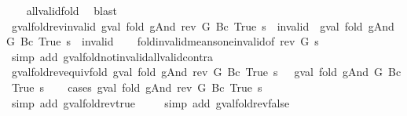 \begin{isabellebody}
%
\isadelimproof
\ \ %
\endisadelimproof
%
\isatagproof
{}\isamarkupfalse%
\ all{\isacharunderscore}valid{\isacharunderscore}fold\ \isamarkupfalse%
\ blast%
\endisatagproof
{\isafoldproof}%
%
\isadelimproof
\isanewline
%
\endisadelimproof
\isanewline
{}\isamarkupfalse%
\ gval{\isacharunderscore}fold{\isacharunderscore}rev{\isacharunderscore}invalid{\isacharcolon}\ {\isachardoublequoteopen}gval\ {\isacharparenleft}fold\ gAnd\ {\isacharparenleft}rev\ G{\isacharparenright}\ {\isacharparenleft}Bc\ True{\isacharparenright}{\isacharparenright}\ s\ {\isacharequal}\ invalid\ {\isasymLongrightarrow}\ gval\ {\isacharparenleft}fold\ gAnd\ G\ {\isacharparenleft}Bc\ True{\isacharparenright}{\isacharparenright}\ s\ {\isacharequal}\ invalid{\isachardoublequoteclose}\isanewline
%
\isadelimproof
\ \ %
\endisadelimproof
%
\isatagproof
{}\isamarkupfalse%
\ fold{\isacharunderscore}invalid{\isacharunderscore}means{\isacharunderscore}one{\isacharunderscore}invalid{\isacharbrackleft}of\ {\isachardoublequoteopen}rev\ G{\isachardoublequoteclose}\ s{\isacharbrackright}\isanewline
\ \ \isamarkupfalse%
\ {\isacharparenleft}simp\ add{\isacharcolon}\ gval{\isacharunderscore}fold{\isacharunderscore}not{\isacharunderscore}invalid{\isacharunderscore}all{\isacharunderscore}valid{\isacharunderscore}contra{\isacharparenright}%
\endisatagproof
{\isafoldproof}%
%
\isadelimproof
\isanewline
%
\endisadelimproof
\isanewline
{}\isamarkupfalse%
\ gval{\isacharunderscore}fold{\isacharunderscore}rev{\isacharunderscore}equiv{\isacharunderscore}fold{\isacharcolon}\ {\isachardoublequoteopen}gval\ {\isacharparenleft}fold\ gAnd\ {\isacharparenleft}rev\ G{\isacharparenright}\ {\isacharparenleft}Bc\ True{\isacharparenright}{\isacharparenright}\ s\ {\isacharequal}\ \ gval\ {\isacharparenleft}fold\ gAnd\ G\ {\isacharparenleft}Bc\ True{\isacharparenright}{\isacharparenright}\ s{\isachardoublequoteclose}\isanewline
%
\isadelimproof
\ \ %
\endisadelimproof
%
\isatagproof
{}\isamarkupfalse%
\ {\isacharparenleft}cases\ {\isachardoublequoteopen}gval\ {\isacharparenleft}fold\ gAnd\ {\isacharparenleft}rev\ G{\isacharparenright}\ {\isacharparenleft}Bc\ True{\isacharparenright}{\isacharparenright}\ s{\isachardoublequoteclose}{\isacharparenright}\isanewline
\ \ \ \ \isamarkupfalse%
\ {\isacharparenleft}simp\ add{\isacharcolon}\ gval{\isacharunderscore}fold{\isacharunderscore}rev{\isacharunderscore}true{\isacharparenright}\isanewline
\ \ \ \isamarkupfalse%
\ {\isacharparenleft}simp\ add{\isacharcolon}\ gval{\isacharunderscore}fold{\isacharunderscore}rev{\isacharunderscore}false{\isacharparenright}\isanewline

\end{isabellebody}
